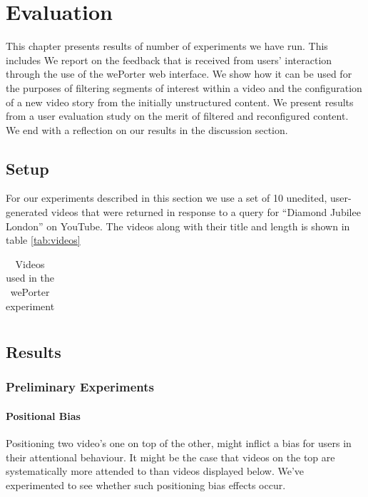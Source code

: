 \chapter{Evaluation}
\label{ch:evaluation}

This chapter presents results of number of experiments we have run. This includes 
We report on the feedback that is received from users' interaction through the use of the wePorter web interface. We show how it can be used for the purposes of filtering segments of interest within a video and the configuration of a new video story from the initially unstructured content. We present results from a user evaluation study on the merit of filtered and reconfigured content. We end with a reflection on our results in the discussion section.

\section{Setup}
For our experiments described in this section we use a set of 10 unedited, user-generated videos that were returned in response to a query for ``Diamond Jubilee London'' on YouTube. The videos along with their title and length is shown in table \ref{tab:videos}

\begin{table}
  \begin{center}
  \begin{tabular}{c}
    
  \end{tabular}
  \end{center}
  \caption{Videos used in the wePorter experiment}
  \label{label}
\end{table}

\section{Results}

\subsection{Preliminary Experiments} %
\label{sub:preliminary_experiments}

\subsubsection{Positional Bias}
Positioning two video's one on top of the other, might inflict a bias for users in their attentional behaviour. It might be the case that videos on the top are systematically more attended to than videos displayed below. We've experimented to see whether such positioning bias effects occur.

